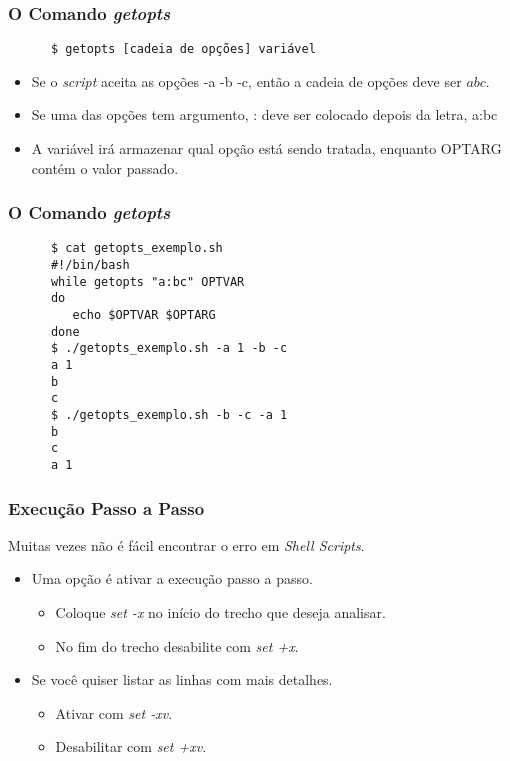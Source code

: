 \documentclass{beamer}
\begin{document}
   \begin{frame}[fragile]
      \frametitle{O Comando \textit{getopts}}
      \begin{verbatim}
      $ getopts [cadeia de opções] variável 
      \end{verbatim}
      \begin{itemize}
         \item Se o \textit{script} aceita as opções -a -b -c, então a cadeia de opções deve ser $abc$. 
         \item Se uma das opções tem argumento, : deve ser colocado depois da letra, a:bc 
         \item A variável irá armazenar qual opção está sendo tratada, enquanto OPTARG contém o valor passado.
      \end{itemize}	 
\end{frame}
   
   \begin{frame}[fragile]
      \frametitle{O Comando \textit{getopts}}
     \begin{verbatim}
      $ cat getopts_exemplo.sh 
      #!/bin/bash
      while getopts "a:bc" OPTVAR
      do
         echo $OPTVAR $OPTARG
      done
      $ ./getopts_exemplo.sh -a 1 -b -c
      a 1
      b
      c
      $ ./getopts_exemplo.sh -b -c -a 1  
      b
      c
      a 1
      \end{verbatim}
\end{frame}

   \begin{frame}
      \frametitle{Execução Passo a Passo}
      Muitas vezes não é fácil encontrar o erro em \textit{Shell Scripts}.
      \begin{itemize}
         \item Uma opção é ativar a execução passo a passo.
	      \begin{itemize}
	         \item Coloque \textit{set -x} no início do trecho que deseja analisar.
	         \item No fim do trecho desabilite com \textit{set +x}. 
	      \end{itemize}
	      \item Se você quiser listar as linhas com mais detalhes.
	      \begin{itemize}
	         \item Ativar com \textit{set -xv}.
	         \item Desabilitar com \textit{set +xv}.
	      \end{itemize}
      \end{itemize}
   \end{frame}
\end{document}
